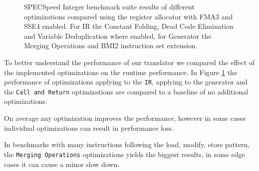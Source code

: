 \documentclass[course=eragp]{aspdoc}
\begin{document}
\begin{figure}
\begin{centering}
        \caption{
            SPECSpeed Integer benchmark suite results of different optimizations compared using the register allocator with FMA3 and SSE4 enabled.
            For IR the Constant Folding, Dead Code Elimination and Variable Deduplication where enabled, for Generator the Merging Operations and BMI2 instruction set extension.
        }\label{benchmark_results2}
    \end{centering}
\end{figure}

To better understand the performance of our translator we compared the effect of the implemented optimizations on
the runtime performance.
In Figure \ref{benchmark_results2} the performance of optimizations applying to the \texttt{IR}, applying to the generator
and the \texttt{Call and Return} optimizations are compared to a baseline of no additional optimizations.

\par

On average any optimization improves the performance, however in some cases individual optimizations can result in performance loss.

\par


\par

In benchmarks with many instructions following the load, modify, store pattern, the \texttt{Merging Operations} optimizations yields the biggest results,
in some edge cases it can cause a minor slow down.
\end{document}
